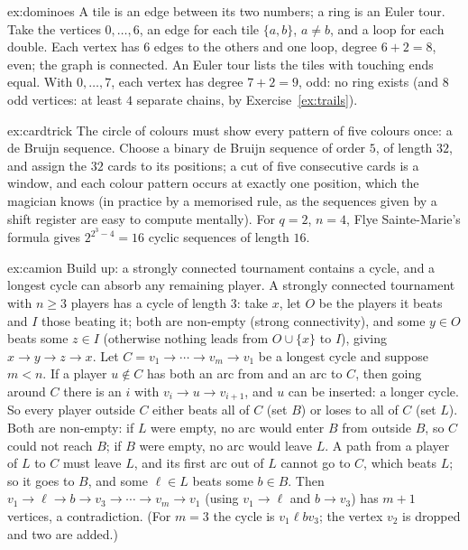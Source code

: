 \begin{solution}{ex:dominoes}
\idea A tile is an edge between its two numbers; a ring is an Euler tour.
\writeup Take the vertices $0,\dots,6$, an edge for each tile $\{a,b\}$, $a\ne b$, and a loop for each double. Each vertex has $6$ edges to the others and
one loop, degree $6+2=8$, even; the graph is connected. An Euler tour lists the tiles with touching ends equal. With $0,\dots,7$, each vertex
has degree $7+2=9$, odd: no ring exists (and $8$ odd vertices: at least $4$ separate chains, by Exercise~\ref{ex:trails}).
\end{solution}

\begin{solution}{ex:cardtrick}
\idea The circle of colours must show every pattern of five colours once: a de Bruijn sequence.
\writeup Choose a binary de Bruijn sequence of order $5$, of length $32$, and assign the $32$ cards to its positions; a cut of five consecutive cards
is a window, and each colour pattern occurs at exactly one position, which the magician knows (in practice by a memorised rule, as
the sequences given by a shift register are easy to compute mentally). For $q=2$, $n=4$, Flye Sainte-Marie's formula gives
$2^{2^3-4}=16$ cyclic sequences of length $16$.
\end{solution}

\begin{solution}{ex:camion}
\idea Build up: a strongly connected tournament contains a cycle, and a longest cycle can absorb any remaining player.
\writeup A strongly connected tournament with $n\ge3$ players has a cycle of length $3$: take $x$, let $O$ be the players it beats and $I$ those beating it;
both are non-empty (strong connectivity), and some $y\in O$ beats some $z\in I$ (otherwise nothing leads from $O\cup\{x\}$ to $I$), giving $x\to y\to z\to x$.
Let $C=v_1\to\cdots\to v_m\to v_1$ be a longest cycle and suppose $m<n$. If a player $u\notin C$ has both an arc from and an arc to $C$, then going around $C$
there is an $i$ with $v_i\to u\to v_{i+1}$, and $u$ can be inserted: a longer cycle. So every player outside $C$ either beats all of $C$ (set $B$) or loses
to all of $C$ (set $L$). Both are non-empty: if $L$ were empty, no arc would enter $B$ from outside $B$, so $C$ could not reach $B$; if $B$ were empty,
no arc would leave $L$. A path from a player of $L$ to $C$ must leave $L$, and its first arc out of $L$ cannot go to $C$, which beats $L$;
so it goes to $B$, and some $\ell\in L$ beats some $b\in B$. Then $v_1\to\ell\to b\to v_3\to\cdots\to v_m\to v_1$ (using $v_1\to\ell$ and $b\to v_3$) has $m+1$
vertices, a contradiction. (For $m=3$ the cycle is $v_1\ell bv_3$; the vertex $v_2$ is dropped and two are added.)
\end{solution}

